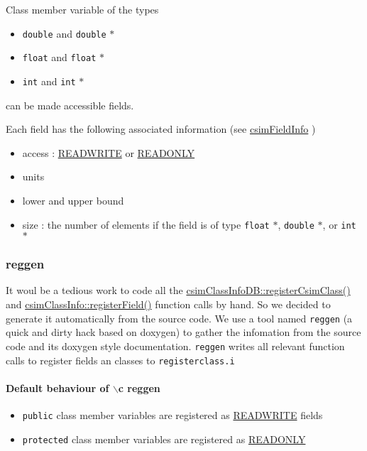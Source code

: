 Class member variable of the types

\begin{itemize}
\item {\tt double} and {\tt double} $\ast$\item {\tt float} and {\tt float} $\ast$\item {\tt int} and {\tt int} $\ast$\end{itemize}


can be made accessible fields.

Each field has the following associated information (see \hyperlink{classcsimFieldInfo}{csim\-Field\-Info} )\begin{itemize}
\item access : \hyperlink{csimclass_8h_a7}{READWRITE} or \hyperlink{csimclass_8h_a6}{READONLY}\item units\item lower and upper bound\item size : the number of elements if the field is of type {\tt float} $\ast$, {\tt double} $\ast$, or {\tt int} $\ast$\end{itemize}
\hypertarget{fields_reggen}{}\subsubsection{reggen}\label{fields_reggen}
It woul be a tedious work to code all the \hyperlink{classcsimClassInfoDB_a2}{csim\-Class\-Info\-DB::register\-Csim\-Class()} and \hyperlink{classcsimClassInfo_z1_0}{csim\-Class\-Info::register\-Field()} function calls by hand. So we decided to generate it automatically from the source code. We use a tool named {\tt reggen} (a quick and dirty hack based on doxygen) to gather the infomation from the source code and its doxygen style documentation. {\tt reggen} writes all relevant function calls to register fields an classes to {\tt registerclass.i} \hypertarget{fields_def}{}\paragraph{Default behaviour of $\backslash$c reggen}\label{fields_def}
\begin{itemize}
\item {\tt public} class member variables are registered as \hyperlink{csimclass_8h_a7}{READWRITE} fields\end{itemize}


\begin{itemize}
\item {\tt protected} class member variables are registered as \hyperlink{csimclass_8h_a6}{READONLY}\end{itemize}



